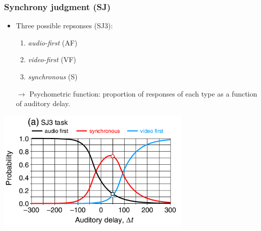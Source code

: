 \documentclass[xcolor={fixpdftex,hyperref,x11names},10pt,pdftex,hyperref={pdftex}]{beamer}
\begin{document}
\begin{frame}
    \frametitle{Synchrony judgment (SJ)}

    \begin{itemize}
        \item Three possible repsonses (SJ3):
            \begin{enumerate}
                \item \textit{audio-first} (AF)
                \item \textit{video-first} (VF)
                \item \textit{synchronous} (S)
            \end{enumerate}

        \item[$\rightarrow$] Psychometric function: proportion of responses of
         each type as a function of auditory delay.

    \end{itemize}
    

    \begin{center}
        \includegraphics[width=0.7\textwidth]{figs/SJ3-psychometric-function.png}
    \end{center}
\end{frame}




\end{document}
